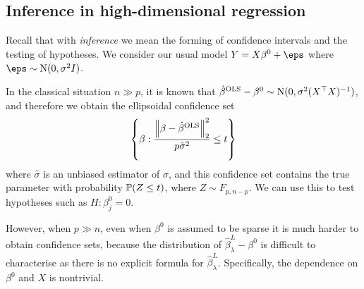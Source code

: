 \subsection{Inference in high-dimensional regression}
Recall that with \emph{inference} we mean the forming of confidence intervals and the testing of hypotheses. We consider our usual model $Y = X\beta^0 + \eps$ where $\eps \sim \Rm N(0, \sigma^2 I)$. 

In the classical situation $n \gg p$, it is known that $\hat\beta^\mathrm{OLS} - \beta^0 \sim \mathrm N(0, \sigma^2 (X^\top X)^{-1})$, and therefore we obtain the ellipsoidal confidence set
\[
\qty{\beta : \frac{\norm{\beta - \hat\beta^\mathrm{OLS}}_2^2}{p\hat\sigma^2} \leq t}
\]
where $\hat\sigma$ is an unbiased estimator of $\sigma$, and this confidence set contains the true parameter with probability $\mathbb P(Z \leq t)$, where $Z \sim F_{p, n-p}$. We can use this to test hypotheses such as $H: \beta_j^0 = 0$.

However, when $p  \gg n$, even when $\beta^0$ is assumed to be sparse it is much harder to obtain confidence sets, because the distribution of $\hat\beta_\lambda^L - \beta^0$  is difficult to characterise as there is no explicit formula for $\hat\beta_\lambda^L$. 
Specifically, the dependence on $\beta^0$ and $X$ is nontrivial.  

